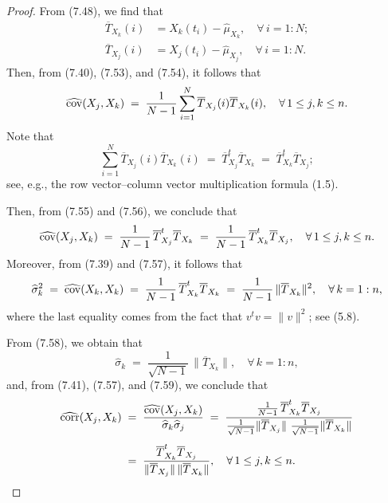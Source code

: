 \begin{proof}
From (7.48), we find that
\begin{align}
\overline{T}_{X_k}(i) &= X_k(t_i) - \widehat{\mu}_{X_k}, \quad \forall\, i=1:N; \\
\overline{T}_{X_j}(i) &= X_j(t_i) - \widehat{\mu}_{X_j}, \quad \forall\, i=1:N.
\end{align}
Then, from (7.40), (7.53), and (7.54), it follows that
\begin{equation}
\widehat{\operatorname{cov}}(X_j,X_k) \;=\; \frac{1}{N-1}\sum_{i=1}^N \overline{T}_{X_j}(i)\overline{T}_{X_k}(i), \quad \forall\, 1\le j,k\le n.
\end{equation}
Note that
\begin{equation}
\sum_{i=1}^N \overline{T}_{X_j}(i)\overline{T}_{X_k}(i) \;=\; \overline{T}^t_{X_j}\overline{T}_{X_k} \;=\; \overline{T}^t_{X_k}\overline{T}_{X_j};
\end{equation}
see, e.g., the row vector--column vector multiplication formula (1.5).

Then, from (7.55) and (7.56), we conclude that
\begin{equation}
\widehat{\operatorname{cov}}(X_j,X_k) \;=\; \frac{1}{N-1}\,\overline{T}^t_{X_j}\overline{T}_{X_k} \;=\; \frac{1}{N-1}\,\overline{T}^t_{X_k}\overline{T}_{X_j}, \quad \forall\, 1\le j,k\le n.
\end{equation}
Moreover, from (7.39) and (7.57), it follows that
\begin{equation}
\widehat{\sigma}_k^2 \;=\; \widehat{\operatorname{cov}}(X_k,X_k) \;=\; \frac{1}{N-1}\,\overline{T}^t_{X_k}\overline{T}_{X_k} \;=\; \frac{1}{N-1}\,\|\overline{T}_{X_k}\|^2, \quad \forall\, k=1:n,
\end{equation}
where the last equality comes from the fact that $v^tv = \|v\|^2$; see (5.8).

From (7.58), we obtain that
\begin{equation}
\widehat{\sigma}_k \;=\; \frac{1}{\sqrt{N-1}}\,\|\overline{T}_{X_k}\|, \quad \forall\, k=1:n,
\end{equation}
and, from (7.41), (7.57), and (7.59), we conclude that
\[
\begin{aligned}
\widehat{\corr}(X_j,X_k)
&\;=\; \frac{\widehat{\cov}(X_j,X_k)}{\widehat{\sigma}_k\widehat{\sigma}_j}
\;=\; \frac{\frac{1}{N-1}\,\overline{T}^t_{X_k}\overline{T}_{X_j}}{\frac{1}{\sqrt{N-1}}\|\overline{T}_{X_j}\|\ \frac{1}{\sqrt{N-1}}\|\overline{T}_{X_k}\|}\\[0.4em]
&\;=\; \frac{\overline{T}^t_{X_k}\overline{T}_{X_j}}{\|\overline{T}_{X_j}\|\,\|\overline{T}_{X_k}\|}, \quad \forall\, 1\le j,k\le n.
\end{aligned}
\]
\end{proof}

